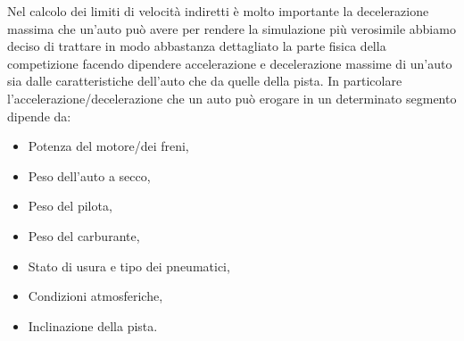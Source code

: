 \documentclass[11pt,a4paper]{report}
\begin{document}
Nel calcolo dei limiti di velocità indiretti è molto importante la decelerazione massima che un'auto può avere per rendere la simulazione più verosimile abbiamo deciso di trattare in modo abbastanza dettagliato la parte fisica della competizione facendo dipendere accelerazione e decelerazione massime di un'auto sia dalle caratteristiche dell'auto che da quelle della pista.
In particolare l'accelerazione/decelerazione che un auto può erogare in un determinato segmento dipende da:
\begin{itemize}
\item Potenza del motore/dei freni,
\item Peso dell'auto a secco,
\item Peso del pilota,
\item Peso del carburante,
\item Stato di usura e tipo dei pneumatici,
\item Condizioni atmosferiche,
\item Inclinazione della pista.
\end{itemize}
\end{document}
